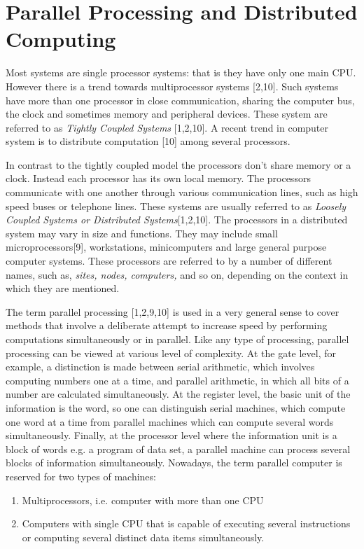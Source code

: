 \chapter{Parallel Processing and Distributed Computing}
Most systems are single processor systems: that is they have only one main CPU. However there is a trend towards multiprocessor systems [2,10]. Such systems
have more than one processor in close communication, sharing the computer bus, the clock and sometimes memory and peripheral devices. These system are referred
to as {\em Tightly Coupled Systems }[1,2,10]. A recent trend in computer system is to distribute computation [10] among several processors. \par
\hspace{1in}In contrast to the tightly coupled model the processors don't share memory or a clock. Instead each processor has its own local memory. The
processors communicate with one another through various communication lines, such as high speed buses or telephone lines. These systems are usually referred to
as {\em Loosely Coupled Systems or Distributed Systems}[1,2,10]. The processors in a distributed system may vary in size and functions. They may include small
microprocessors[9], workstations, minicomputers and large general purpose computer systems. These processors are referred to by a number of different names,
such as, {\em sites, nodes, computers,} and so on, depending on the context in which they are mentioned.

\hspace{1in}The term parallel processing [1,2,9,10] is used in a very general sense to cover methods that involve a deliberate attempt to increase speed
by performing computations simultaneously or in parallel. Like any type of processing, parallel processing can be viewed at various level of complexity. At
the gate level, for example, a distinction is made between serial arithmetic, which involves computing numbers one at a time, and parallel arithmetic, in which
all bits of a number are calculated simultaneously. At the register level, the basic unit of the information is the word, so one can distinguish serial
machines, which compute one word at a time from parallel machines which can compute several words simultaneously. Finally, at the processor level where
the information unit is a block of words e.g. a program of data set, a parallel machine can process several blocks of information simultaneously. Nowadays,
the term parallel computer is reserved for two types of machines: \par
\begin{enumerate}
\item Multiprocessors, i.e. computer with more than one CPU
\item Computers with single CPU that is capable of executing several instructions or computing several distinct data items simultaneously. 
\end{enumerate}


